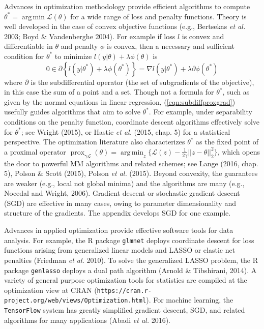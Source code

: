 \documentclass[12pt]{TD-CJS}
\newcommand{\prox}{ \mathop{\mathrm{prox}} }
\DeclareMathOperator*{\argmin}{arg\,min}
\begin{document}
Advances in optimization methodology provide efficient algorithms
to compute $\theta^* = \argmin \mathcal{L}(\theta)$  for a wide range of  loss and penalty functions. 
Theory is well developed in the case of convex objective functions (e.g., Bertsekas {\em et al.} 2003; Boyd \& Vandenberghe 2004). For example
if loss $l$ is convex and differentiable in $\theta$ and penalty $\phi$ is convex, then 
a necessary and sufficient condition for $\theta^*$ to minimize $ l(y|\theta) + \lambda\phi(\theta)$  is 
\begin{equation}
\label{eqn:subdiffproxgrad}
0 \in \partial \left\{ l(y|\theta^*) + \lambda\phi(\theta^*)\right\} = \nabla l(y|\theta^*) + \lambda\partial \phi(\theta^*) 
\end{equation}
where $\partial$ is the subdifferential operator (the set of subgradients of the objective), in this case
the sum of a point and a set.   Though not a formula for $\theta^*$, such as given by the normal equations in linear regression, 
(\ref{eqn:subdiffproxgrad}) usefully guides algorithms that aim to solve $\theta^*$.   
For example, under separability conditions on the penalty function, coordinate descent algorithms effectively solve for $\theta^*$;
see Wright (2015), or  Hastie {\em et al.} (2015, chap. 5) for a statistical perspective.
The optimization literature also characterizes $\theta^*$ as the fixed point of a proximal operator
$\prox_{\gamma \mathcal{L}}(\theta) = \argmin_z \{ \mathcal{L}(z) - \frac{1}{2\gamma} || z - \theta||_2^2  \}$, 
which opens the door to powerful MM algorithms and related schemes; 
 see Lange (2016, chap. 5), Polson \& Scott (2015), Polson {\em et al.} (2015).  
Beyond convexity, the guarantees are weaker (e.g., local
not global minima) and the algorithms are many (e.g., Nocedal and Wright, 2006).  Gradient descent
or stochastic gradient descent (SGD) are effective in many cases, owing to parameter 
dimensionality and structure of the gradients.  The appendix develops SGD for one example.

Advances in applied optimization provide effective software tools for data analysis. For example, the R package
\verb+glmnet+ deploys coordinate descent for loss functions arising from generalized linear models and LASSO or 
elastic net penalties (Friedman {\em et al.} 2010). To solve the generalized LASSO problem, the R package 
\verb+genlasso+  deploys a dual path algorithm (Arnold \& Tibshirani, 2014).  A variety of general 
purpose optimization tools for statistics are compiled at the optimization view at CRAN 
(\verb+https://cran.r-project.org/web/views/Optimization.html+). For machine learning, the \verb+TensorFlow+ system has greatly simplified 
gradient descent, SGD, and related algorithms for many applications (Abadi {\em et al.} 2016).  
\end{document}
